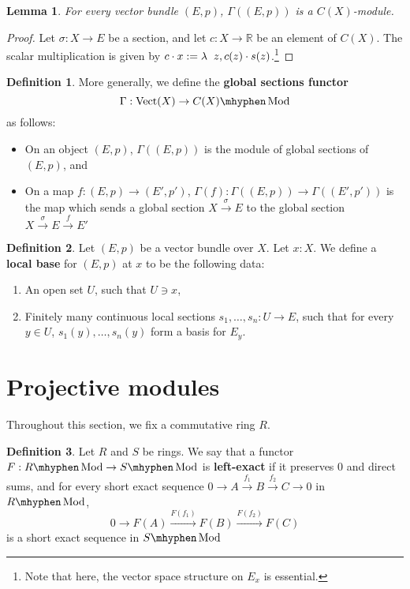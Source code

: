 \documentclass[11pt]{article}
\newcommand{\R}{\mathbb{R}}
\newcommand{\Vect}{\operatorname{Vect}}
\newcommand{\Mod}{\mhyphen\operatorname{Mod}}
\theoremstyle{plain}
\newtheorem{lemma}{Lemma}[section]
\theoremstyle{definition}
\newtheorem{definition}{Definition}[section]
\begin{document}
\begin{lemma}\label{lemma-global-sections-module}
  For every vector bundle \((E,p)\), \(\Gamma((E,p))\) is a \(C(X)\)-module.
\end{lemma}
\begin{proof}
  Let \(\sigma : X \to E\) be a section, and let \(c : X \to \R\) be an element of \(C(X)\). The scalar multiplication is given by \(c \cdot x := \lambda \hspace{2mm} z, c(z) \cdot s(z)\).\footnote{Note that here, the vector space structure on \(E_x\) is essential.}
\end{proof}

\begin{definition}\label{def-global-sections-functor}
  More generally, we define the \textbf{global sections functor}
  \[\Gamma : \Vect(X) \to C(X)\Mod\]
  as follows:
  \begin{itemize}
  \item On an object \((E,p)\), \(\Gamma((E,p))\) is the module of global sections of \((E,p)\), and
    \item On a map \(f : (E,p) \to (E',p')\), \(\Gamma(f) : \Gamma((E,p)) \to \Gamma((E',p'))\) is the map which sends a global section \(X \overset{\sigma}{\to} E\) to the global section \(X \overset{\sigma}{\to} E \overset{f}{\to} E'\)
  \end{itemize}
  
\end{definition}

\begin{definition}\label{def-local-base}
  Let \((E,p)\) be a vector bundle over \(X\). Let \(x : X\). We define a \textbf{local base} for \((E,p)\) at \(x\) to be the following data:
  \begin{enumerate}[label={(\alph*)}]
  \item An open set \(U\), such that \(U \ni x\),
  \item Finitely many continuous local sections \(s_1, \dots, s_n : U \to E\), such that for every \(y \in U\), \(s_1(y), \dots, s_n(y)\) form a basis for \(E_y\).
  \end{enumerate}
\end{definition}

\section{Projective modules}
Throughout this section, we fix a commutative ring \(R\).

\begin{definition} \label{def-left-exact}
  Let \(R\) and \(S\) be rings. We say that a functor \(F : R\Mod \to S\Mod\) is \textbf{left-exact} if it preserves \(0\) and direct sums, and for every short exact sequence \(0 \to A \overset{f_1}{\to} B \overset{f_2}{\to} C \to 0\) in \(R\Mod\),
  \[0 \to F(A) \overset{F(f_1)}{\to} F(B) \overset{F(f_2)}{\to} F(C)\]
  is a short exact sequence in \(S\Mod\)
\end{definition}
\end{document}
